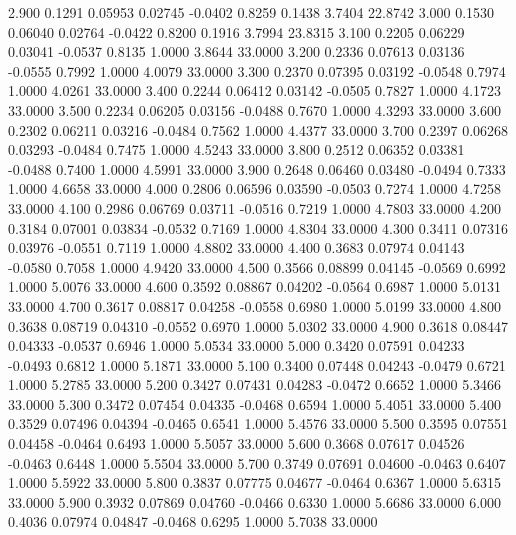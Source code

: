    2.900   0.1291   0.05953   0.02745  -0.0402   0.8259   0.1438   3.7404  22.8742
   3.000   0.1530   0.06040   0.02764  -0.0422   0.8200   0.1916   3.7994  23.8315
   3.100   0.2205   0.06229   0.03041  -0.0537   0.8135   1.0000   3.8644  33.0000
   3.200   0.2336   0.07613   0.03136  -0.0555   0.7992   1.0000   4.0079  33.0000
   3.300   0.2370   0.07395   0.03192  -0.0548   0.7974   1.0000   4.0261  33.0000
   3.400   0.2244   0.06412   0.03142  -0.0505   0.7827   1.0000   4.1723  33.0000
   3.500   0.2234   0.06205   0.03156  -0.0488   0.7670   1.0000   4.3293  33.0000
   3.600   0.2302   0.06211   0.03216  -0.0484   0.7562   1.0000   4.4377  33.0000
   3.700   0.2397   0.06268   0.03293  -0.0484   0.7475   1.0000   4.5243  33.0000
   3.800   0.2512   0.06352   0.03381  -0.0488   0.7400   1.0000   4.5991  33.0000
   3.900   0.2648   0.06460   0.03480  -0.0494   0.7333   1.0000   4.6658  33.0000
   4.000   0.2806   0.06596   0.03590  -0.0503   0.7274   1.0000   4.7258  33.0000
   4.100   0.2986   0.06769   0.03711  -0.0516   0.7219   1.0000   4.7803  33.0000
   4.200   0.3184   0.07001   0.03834  -0.0532   0.7169   1.0000   4.8304  33.0000
   4.300   0.3411   0.07316   0.03976  -0.0551   0.7119   1.0000   4.8802  33.0000
   4.400   0.3683   0.07974   0.04143  -0.0580   0.7058   1.0000   4.9420  33.0000
   4.500   0.3566   0.08899   0.04145  -0.0569   0.6992   1.0000   5.0076  33.0000
   4.600   0.3592   0.08867   0.04202  -0.0564   0.6987   1.0000   5.0131  33.0000
   4.700   0.3617   0.08817   0.04258  -0.0558   0.6980   1.0000   5.0199  33.0000
   4.800   0.3638   0.08719   0.04310  -0.0552   0.6970   1.0000   5.0302  33.0000
   4.900   0.3618   0.08447   0.04333  -0.0537   0.6946   1.0000   5.0534  33.0000
   5.000   0.3420   0.07591   0.04233  -0.0493   0.6812   1.0000   5.1871  33.0000
   5.100   0.3400   0.07448   0.04243  -0.0479   0.6721   1.0000   5.2785  33.0000
   5.200   0.3427   0.07431   0.04283  -0.0472   0.6652   1.0000   5.3466  33.0000
   5.300   0.3472   0.07454   0.04335  -0.0468   0.6594   1.0000   5.4051  33.0000
   5.400   0.3529   0.07496   0.04394  -0.0465   0.6541   1.0000   5.4576  33.0000
   5.500   0.3595   0.07551   0.04458  -0.0464   0.6493   1.0000   5.5057  33.0000
   5.600   0.3668   0.07617   0.04526  -0.0463   0.6448   1.0000   5.5504  33.0000
   5.700   0.3749   0.07691   0.04600  -0.0463   0.6407   1.0000   5.5922  33.0000
   5.800   0.3837   0.07775   0.04677  -0.0464   0.6367   1.0000   5.6315  33.0000
   5.900   0.3932   0.07869   0.04760  -0.0466   0.6330   1.0000   5.6686  33.0000
   6.000   0.4036   0.07974   0.04847  -0.0468   0.6295   1.0000   5.7038  33.0000
